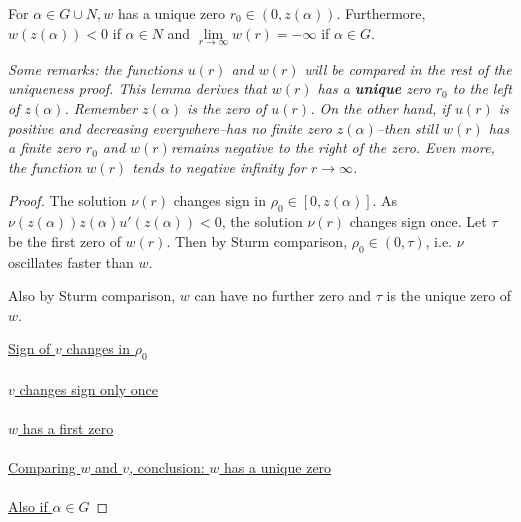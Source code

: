\begin{lemma}\label{wq}For $\alpha\in G\cup N,w$ has a unique zero $r_0\in(0,z(\alpha)).$ Furthermore, $w(z(\alpha))<0$ if $\alpha\in N$ and $\underset{r\to\infty}{\lim}w(r)=-\infty$ if $\alpha\in G$.

\emph{Some remarks: the functions $u(r)$ and $w(r)$ will be compared in the rest of the uniqueness proof. This lemma derives that $w(r)$ has a \textbf{unique} zero $r_0$ to the left of $z(\alpha)$. Remember $z(\alpha)$ is the zero of $u(r)$. On the other hand, if $u(r)$ is positive and decreasing everywhere--has no finite zero $z(\alpha)$--then still $w(r)$ has a finite zero $r_0$ and $w(r)$remains negative to the right of the zero. Even more, the function $w(r)$ tends to negative infinity for $r\to\infty$.}
\begin{proof}
The solution $\nu(r)$ changes sign in $\rho_0\in[0,z(\alpha)]$. As $\nu(z(\alpha))z(\alpha)u'(z(\alpha))<0$, the solution $\nu(r)$ changes sign once. Let $\tau$ be the first zero of $w(r)$. Then by Sturm comparison, $\rho_0\in(0,\tau)$, i.e. $\nu$ oscillates faster than $w$.

Also by Sturm comparison, $w$ can have no further zero and $\tau$ is the unique zero of $w$.

\underline{Sign of $v$ changes in $\rho_0$} \\ \\

\underline{$v$ changes sign only once} \\ \\

\underline{$w$ has a first zero} \\ \\

\underline{Comparing $w$ and $v$, conclusion: $w$ has a unique zero} \\ \\

\underline{Also if $\alpha\in G$}


\end{proof}
\end{lemma}
